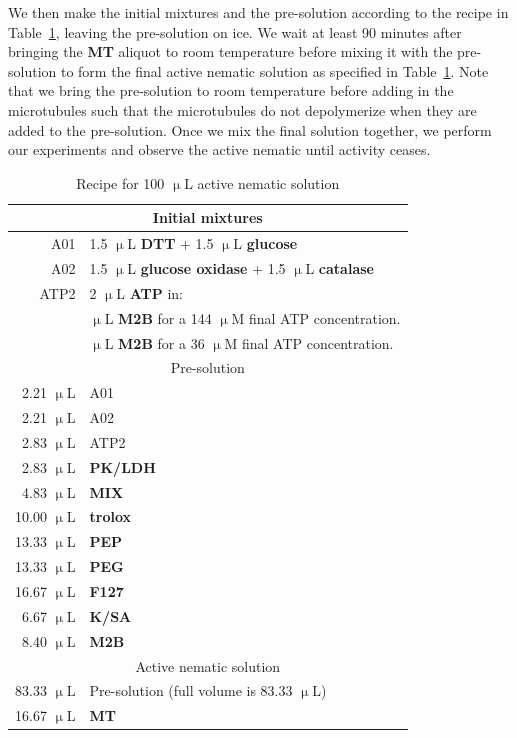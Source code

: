 We then make the initial mixtures and the pre-solution according to the recipe in Table~\ref{t:3-recipe}, leaving the pre-solution on ice.
We wait at least 90 minutes after bringing the {\bf MT} aliquot to room temperature before mixing it with the pre-solution to form the final active nematic solution as specified in Table~\ref{t:3-recipe}.
Note that we bring the pre-solution to room temperature before adding in the microtubules such that the microtubules do not depolymerize when they are added to the pre-solution.
Once we mix the final solution together, we perform our experiments and observe the active nematic until activity ceases.
\begin{table}[ht]
  \centering
  \caption{Recipe for 100 $\upmu$L active nematic solution}
  \begin{tabular}{|r l|}
    \hline
    \multicolumn{2}{|c|}{Initial mixtures}\\
    \hline
    A01 & 1.5 $\upmu$L {\bf DTT} + 1.5 $\upmu$L {\bf glucose} \\
    A02 & 1.5 $\upmu$L {\bf glucose oxidase} + 1.5 $\upmu$L {\bf catalase} \\
    ATP2 & 2 $\upmu$L {\bf ATP} in:\\
    & \quad 18 $\upmu$L {\bf M2B} for a 144 $\upmu$M final ATP concentration.\\
    & \quad 38 $\upmu$L {\bf M2B} for a 36 $\upmu$M final ATP concentration.\\
    \hline
    \multicolumn{2}{|c|}{Pre-solution}\\
    \hline
    2.21 $\upmu$L & A01\\
    2.21 $\upmu$L & A02\\
    2.83 $\upmu$L & ATP2\\
    2.83 $\upmu$L & {\bf PK/LDH} \\
    4.83 $\upmu$L & {\bf MIX}\\
    10.00 $\upmu$L & {\bf trolox}\\
    13.33 $\upmu$L & {\bf PEP}\\
    13.33 $\upmu$L & {\bf PEG}\\
    16.67 $\upmu$L & {\bf F127}\\
    6.67 $\upmu$L & {\bf K/SA}\\
    8.40 $\upmu$L & {\bf M2B}\\
    \hline
    \multicolumn{2}{|c|}{Active nematic solution}\\
    \hline
    83.33 $\upmu$L & Pre-solution (full volume is 83.33 $\upmu$L)\\
    16.67 $\upmu$L & {\bf MT}\\
    \hline
  \end{tabular}
  \label{t:3-recipe}
\end{table}


